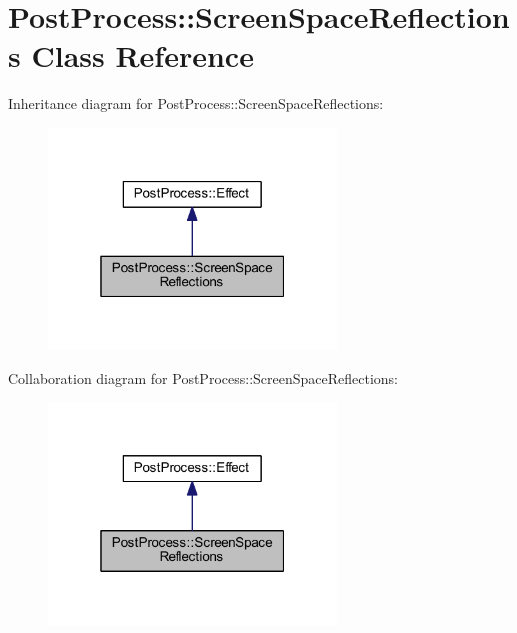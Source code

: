 \hypertarget{class_post_process_1_1_screen_space_reflections}{}\section{Post\+Process\+:\+:Screen\+Space\+Reflections Class Reference}
\label{class_post_process_1_1_screen_space_reflections}


Inheritance diagram for Post\+Process\+:\+:Screen\+Space\+Reflections\+:
\nopagebreak
\begin{figure}[H]
\begin{center}
\leavevmode
\includegraphics[width=217pt]{class_post_process_1_1_screen_space_reflections__inherit__graph}
\end{center}
\end{figure}


Collaboration diagram for Post\+Process\+:\+:Screen\+Space\+Reflections\+:
\nopagebreak
\begin{figure}[H]
\begin{center}
\leavevmode
\includegraphics[width=217pt]{class_post_process_1_1_screen_space_reflections__coll__graph}
\end{center}
\end{figure}
